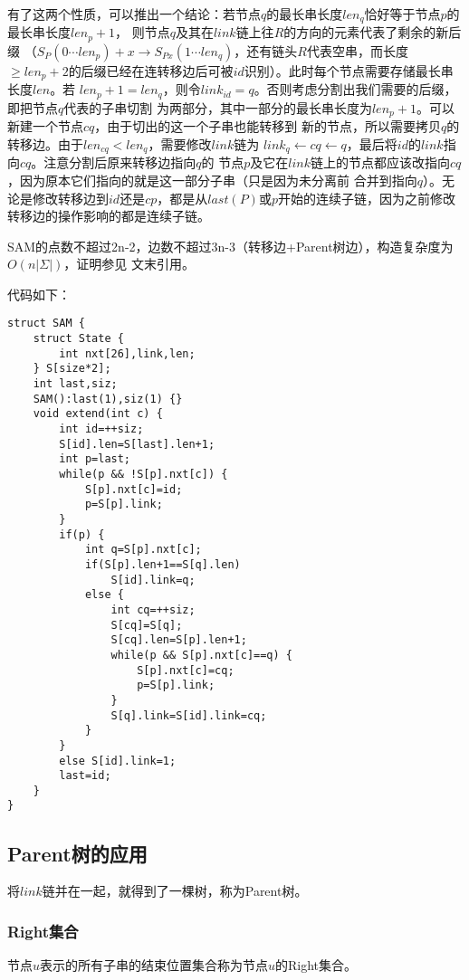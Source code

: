 有了这两个性质，可以推出一个结论：若节点$q$的最长串长度$len_q$恰好等于节点$p$的最长串长度$len_p+1$，
则节点$q$及其在$link$链上往$R$的方向的元素代表了剩余的新后缀
（$S_P(0\cdots len_p)+x\rightarrow S_{Px}(1 \cdots len_q)$，还有链头$R$代表空串，而长度
$\geq len_p+2$的后缀已经在连转移边后可被$id$识别）。此时每个节点需要存储最长串长度$len$。若
$len_p+1=len_q$，则令$link_{id}=q$。否则考虑分割出我们需要的后缀，即把节点$q$代表的子串切割
为两部分，其中一部分的最长串长度为$len_p+1$。可以新建一个节点$cq$，由于切出的这一个子串也能转移到
新的节点，所以需要拷贝$q$的转移边。由于$len_{cq}<len_q$，需要修改$link$链为
$link_q\leftarrow cq \leftarrow q$，最后将$id$的$link$指向$cq$。注意分割后原来转移边指向$q$的
节点$p$及它在$link$链上的节点都应该改指向$cq$，因为原本它们指向的就是这一部分子串（只是因为未分离前
合并到指向$q$）。无论是修改转移边到$id$还是$cp$，都是从$last(P)$或$p$开始的连续子链，因为之前修改
转移边的操作影响的都是连续子链。

SAM的点数不超过2n-2，边数不超过3n-3（转移边+Parent树边），构造复杂度为$O(n|\Sigma|)$，证明参见
文末引用。

代码如下：
\begin{lstlisting}
struct SAM {
    struct State {
        int nxt[26],link,len;
    } S[size*2];
    int last,siz;
    SAM():last(1),siz(1) {}
    void extend(int c) {
        int id=++siz;
        S[id].len=S[last].len+1;
        int p=last;
        while(p && !S[p].nxt[c]) {
            S[p].nxt[c]=id;
            p=S[p].link;
        }
        if(p) {
            int q=S[p].nxt[c];
            if(S[p].len+1==S[q].len)
                S[id].link=q;
            else {
                int cq=++siz;
                S[cq]=S[q];
                S[cq].len=S[p].len+1;
                while(p && S[p].nxt[c]==q) {
                    S[p].nxt[c]=cq;
                    p=S[p].link;
                }
                S[q].link=S[id].link=cq;
            }
        }
        else S[id].link=1;
        last=id;
    }
}
\end{lstlisting}


\subsection{Parent树的应用}
将$link$链并在一起，就得到了一棵树，称为Parent树。
\subsubsection{Right集合}
节点$u$表示的所有子串的结束位置集合称为节点$u$的Right集合。


